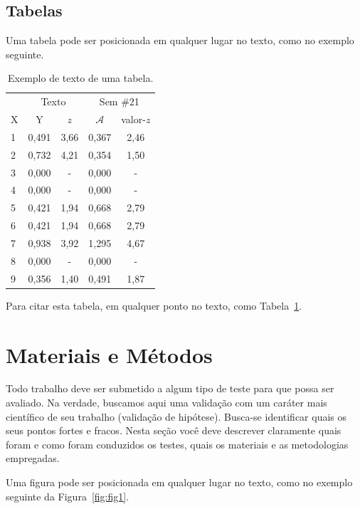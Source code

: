 \documentclass[twoside,conference,a4paper]{IEEEtran}
\begin{document}
\subsection{Tabelas}

Uma tabela pode ser posicionada em qualquer lugar no texto, como no exemplo
seguinte.
%
\begin{table}[ht]
\renewcommand{\arraystretch}{1.3}
\centering
 \caption{Exemplo de texto de uma tabela.}
 \label{tab:tab1}
 \begin{tabular}{lcccc}\hline
  & \multicolumn{2}{c}{Texto}
  & \multicolumn{2}{c}{Sem \#21} \\ \cline{2-5}
  X & Y & $z$ & $\mathcal{A}$ & valor-$z$ \\ \hline \hline
  1      &0,491  & 3,66   &0,367 &2,46  \\
  2    &0,732  & 4,21   &0,354 &1,50  \\
  3      &0,000  & -      &0,000 & -    \\
  4      &0,000  & -      &0,000 & -  \\
  5      &0,421  & 1,94   &0,668 &2,79  \\
  6      &0,421  & 1,94   &0,668 &2,79  \\
  7      &0,938  & 3,92   &1,295 &4,67 \\
  8       &0,000  & -      &0,000 & - \\
  9       &0,356  & 1,40   &0,491 &1,87 \\ \hline
 \end{tabular}
\end{table}

Para citar esta tabela, em qualquer ponto no texto, como Tabela~\ref{tab:tab1}.


\section{Materiais e Métodos}

Todo trabalho deve ser submetido a algum tipo de teste para que possa ser avaliado. Na verdade, buscamos aqui uma validação com um caráter mais científico de seu trabalho (validação de hipótese). Busca-se identificar quais os seus pontos fortes e fracos. Nesta seção você deve descrever claramente quais foram e como foram conduzidos os testes, quais os materiais e as metodologias empregadas.   

Uma figura pode ser posicionada em qualquer lugar no texto, como no exemplo seguinte da Figura~\ref{fig:fig1}.
\end{document}
